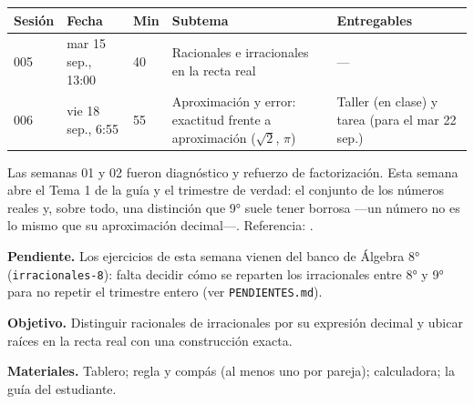 \documentclass[11pt]{article}
\begin{document}
\encabezado*

\begin{center}
{\renewcommand{\arraystretch}{1.3}
\begin{tabularx}{\linewidth}{@{}l l l X l@{}}
  \toprule
  \textbf{Sesión} & \textbf{Fecha} & \textbf{Min} & \textbf{Subtema} & \textbf{Entregables}\\
  \midrule
  005 & mar 15 sep., 13:00 & 40 & Racionales e irracionales en la recta real & ---\\
  006 & vie 18 sep., 6:55 & 55 & Aproximación y error: exactitud frente a aproximación
      ($\sqrt{2}$, $\pi$) & Taller (en clase) y tarea (para el mar 22 sep.)\\
  \bottomrule
\end{tabularx}}
\end{center}

Las semanas 01 y 02 fueron diagnóstico y refuerzo de factorización. Esta semana abre el
Tema 1 de la guía y el trimestre de verdad: el conjunto de los números reales y, sobre
todo, una distinción que 9° suele tener borrosa —un número no es lo mismo que su
aproximación decimal—. Referencia: .

\begin{nota}
\textbf{Pendiente.} Los ejercicios de esta semana vienen del banco de Álgebra 8°
(\texttt{irracionales-8}): falta decidir cómo se reparten los irracionales entre 8° y 9°
para no repetir el trimestre entero (ver \texttt{PENDIENTES.md}).
\end{nota}


\textbf{Objetivo.} Distinguir racionales de irracionales por su expresión decimal y ubicar
raíces en la recta real con una construcción exacta.

\textbf{Materiales.} Tablero; regla y compás (al menos uno por pareja); calculadora; la
guía del estudiante.
\end{document}

